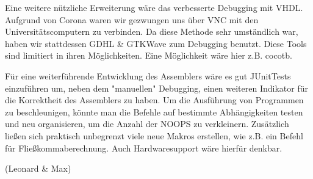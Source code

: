 \documentclass[paper=a4,fontsize=12pt,twocolumn]{scrreprt}
\begin{document}
Eine weitere nützliche Erweiterung wäre das verbesserte Debugging mit VHDL. Aufgrund von Corona waren wir gezwungen uns über VNC mit den Universitätscomputern zu verbinden. Da diese Methode sehr umständlich war, haben wir stattdessen GDHL \& GTKWave zum Debugging benutzt. Diese Tools sind limitiert in ihren Möglichkeiten. Eine Möglichkeit wäre hier z.B. cocotb.

Für eine weiterführende Entwicklung des Assemblers wäre es gut JUnitTests einzuführen um, neben dem "manuellen" Debugging, einen weiteren Indikator für die Korrektheit des Assemblers zu haben. 
Um die Ausführung von Programmen zu beschleunigen, könnte man die Befehle auf bestimmte Abhängigkeiten testen und neu organisieren, um die Anzahl der NOOPS zu verkleinern. 
Zusätzlich ließen sich praktisch unbegrenzt viele neue Makros erstellen, wie z.B. ein Befehl für Fließkommaberechnung. Auch Hardwaresupport wäre hierfür denkbar. 

(Leonard \& Max)
\end{document}
